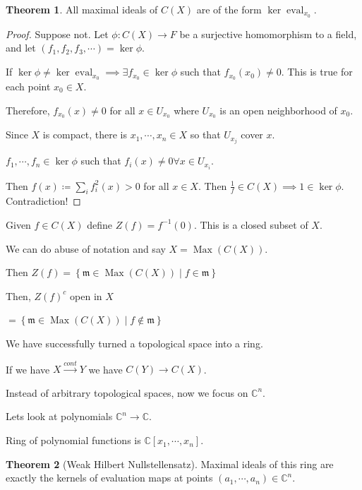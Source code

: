 \documentclass{article}
\theoremstyle{definition}
\newtheorem{theorem}{Theorem}
\begin{document}
    \begin{theorem}
        All maximal ideals of \(C(X)\) are of the form \(\ker \operatorname{eval}_{x_0}\).
    \end{theorem}

    \begin{proof}
        Suppose not. Let \(\phi : C(X) \to F\) be a surjective homomorphism to a field, and let \((f_1, f_2, f_3, \cdots) = \ker \phi\).
        
        If \(\ker \phi \neq \ker \operatorname{eval}_{x_0} \implies \exists f_{x_0}\in \ker \phi\) such that \(f_{x_0}(x_0)\neq 0\). This is true for each point \(x_0\in X\).

        Therefore, \(f_{x_0}(x)\neq 0\) for all \(x\in U_{x_0}\) where \(U_{x_0}\) is an open neighborhood of \(x_0\).

        Since \(X\) is compact, there is \(x_1, \cdots , x_n \in X\) so that \(U_{x_j}\) cover \(x\).

        \(f_1, \cdots , f_n \in \ker \phi\) such that \(f_i(x) \neq 0 \forall x\in U_{x_i}\).

        Then \(f(x) \coloneqq \sum_{i} f_i^2(x) > 0\) for all \(x\in X\). Then \(\frac{1}{f}\in C(X) \implies 1\in \ker \phi\). Contradiction!  
    \end{proof}

    Given \(f\in C(X)\) define \(Z(f) = f ^{-1} (0)\). This is a closed subset of \(X\).
    
    We can do abuse of notation and say \(X = \operatorname{Max}(C(X))\).

    Then \(Z(f) = \left\{ \mathfrak{m} \in \operatorname{Max} (C(X)) \mid f\in \mathfrak{m} \right\} \) 

    Then, \(Z(f)^c\) open in \(X\)

    \(= \left\{ \mathfrak{m} \in \operatorname{Max} (C(X)) \mid f\notin \mathfrak{m} \right\} \) 

    We have successfully turned a topological space into a ring.

    If we have \(X \xrightarrow{cont} Y\) we have \(C(Y) \to C(X)\).

    Instead of arbitrary topological spaces, now we focus on \(\mathbb{C}^n\).

    Lets look at polynomials \(\mathbb{C}^n \to \mathbb{C}\).

    Ring of polynomial functions is \(\mathbb{C} [x_1, \cdots , x_n]\).

    \begin{theorem}
        [Weak Hilbert Nullstellensatz] Maximal ideals of this ring are exactly the kernels of evaluation maps at points \((a_1, \cdots , a_n) \in \mathbb{C}^n\).
    \end{theorem}
\end{document}
